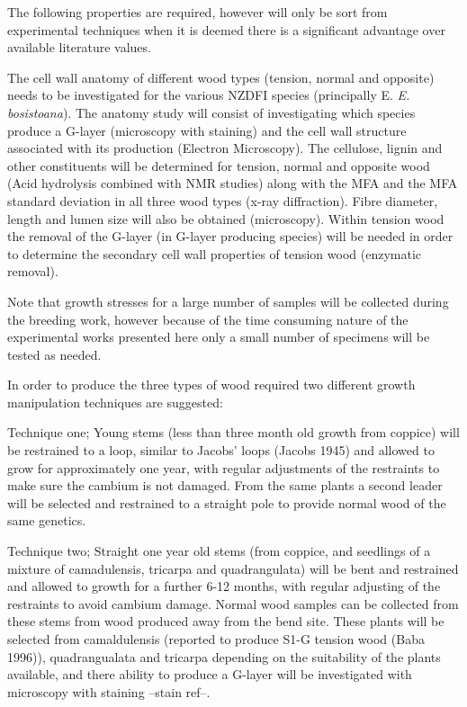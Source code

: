 \documentclass{article}
\begin{document}
The following properties are required, however will only be sort from
experimental techniques when it is deemed there is a significant advantage over
available literature values.

The cell wall anatomy of different wood types (tension, normal and opposite)
needs to be investigated for the various NZDFI species (principally E.
\textit{E. bosistoana}). The anatomy study will consist of investigating which species
produce a G-layer (microscopy with staining) and the cell wall structure
associated with its production (Electron Microscopy). The cellulose, lignin and
other constituents will be determined for tension, normal and opposite wood
(Acid hydrolysis combined with NMR studies) along with the MFA and the MFA
standard deviation in all three wood types (x-ray diffraction). Fibre diameter,
length and lumen size will also be obtained (microscopy). Within tension wood
the removal of the G-layer (in G-layer producing species) will be needed in
order to determine the secondary cell wall properties of tension wood (enzymatic
removal).

Note that growth stresses for a large number of samples will be collected during
the breeding work, however because of the time consuming nature of the
experimental works presented here only a small number of specimens will be
tested as needed.

In order to produce the three types of wood required two different growth
manipulation techniques are suggested:

Technique one; Young stems (less than three month old growth from coppice) will
be restrained to a loop, similar to Jacobs' loops (Jacobs 1945) and allowed to
grow for approximately one year, with regular adjustments of the restraints to
make sure the cambium is not damaged. From the same plants a second leader will
be selected and restrained to a straight pole to provide normal wood of the same
genetics.

Technique two; Straight one year old stems (from coppice, and seedlings of a
mixture of camadulensis, tricarpa and quadrangulata) will be bent and restrained
and allowed to growth for a further 6-12 months, with regular adjusting of the
restraints to avoid cambium damage. Normal wood samples can be collected from
these stems from wood produced away from the bend site. These plants will be
selected from camaldulensis (reported to produce S1-G tension wood (Baba 1996)),
quadrangualata and tricarpa depending on the suitability of the plants
available, and there ability to produce a G-layer will be investigated with
microscopy with staining --stain ref--.
\end{document}
